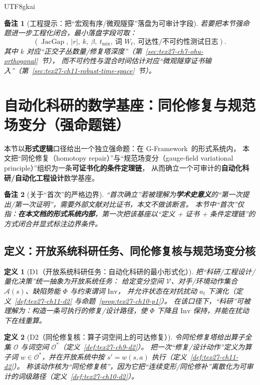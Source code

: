 \documentclass[12pt]{article}
\newtheorem{definition}{定义}[section]
\newtheorem{remark}{备注}[section]
\newcommand{\JacGap}{\operatorname{JacGap}}
\newcommand{\GFramework}{\textsf{G-Framework}}
\begin{document}
\begin{CJK*}{UTF8}{gkai}
\begin{remark}[工程提示：把“宏观有序/微观隧穿”落盘为可审计字段]
若要把本节强命题进一步工程化闭合，最小落盘字段可取：
\[
  (\JacGap,\ |r|,\ k,\ \beta,\ t_{\mathrm{mix}},\ \text{词 }W_t,\ \text{可达性/不可约性测试日志}).
\]
其中 $k$ 对应“正交子丛数量/修复塔深度”（第~\ref{sec:tex27-ch7-ohu-orthogonal}~节），
而不可约性与混合时间估计对应“微观隧穿证书输入”（第~\ref{sec:tex27-ch11-robust-time-space}~节）。
\end{remark}

\section{自动化科研的数学基座：同伦修复与规范场变分（强命题链）}
\label{sec:tex27-ch15-autoscience-foundation}

本节以\textbf{形式逻辑}口径给出一个独立强命题：在 \GFramework\ 的形式系统内，
本文把“同伦修复（homotopy repair）”与“规范场变分（gauge-field variational principle）”组织为一条\textbf{可证书化的条件定理链}，
从而确立一个可审计的\textbf{自动化科研/自动化工程设计}数学基座。

\begin{remark}[关于“首次”的严格边界]
“首次确立”若被理解为\textbf{学术史意义}的“第一次提出/第一次证明”，需要外部文献对比证书，本文不做该断言。
本节中“首次”仅指：\textbf{在本文档的形式系统内部}，第一次把该基座以“定义 + 证书 + 条件定理链”的方式闭合并显式标注边界条件。
\end{remark}

\subsection{定义：开放系统科研任务、同伦修复核与规范场变分核}
\label{subsec:tex27-ch15-defs}

\begin{definition}[D1（开放系统科研任务：自动化科研的最小形式化）]
\label{def:tex27-ch15-d1}
把“科研/工程设计/量化决策”统一抽象为开放系统任务：
给定变分空间 $\mathcal{V}$、对手/环境动作集合 $\mathcal{A}(s)$、缺陷势能 $\Phi$ 与约束谓词 $\mathrm{Inv}$，
并允许状态在对抗扰动 $a_t$ 下演化（定义~\ref{def:tex27-ch11-d2} 与命题~\ref{prop:tex27-ch10-p1}）。
在该口径下，“科研”可被理解为：构造一条可执行的修复/设计路径，使 $\Phi$ 下降且 $\mathrm{Inv}$ 保持，并能在扰动下在线重算。
\end{definition}

\begin{definition}[D2（同伦修复核：算子词空间上的可达修复）]
\label{def:tex27-ch15-d2}
令同伦修复塔给出算子全集 $\mathcal{O}$ 与词空间 $\mathcal{O}^*$（定义~\ref{def:tex27-ch9-d2}）。
把一次“修复/设计动作”定义为算子词 $w\in\mathcal{O}^*$，并在开放系统中按 $s'=w(s,a)$ 执行（定义~\ref{def:tex27-ch11-d2}）。
称该动作核为“同伦修复核”，因为它把“连续变形/同伦修补”离散化为可审计的词级路径（定义~\ref{def:tex27-ch10-d2}）。
\end{definition}


\end{CJK*}
\end{document}
